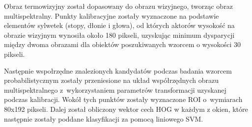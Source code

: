 Obraz termowizyjny został dopasowany do obrazu wizyjnego, tworząc obraz multispektralny. 
Punkty kalibracyjne zostały wyznaczone na podstawie elementów sylwetek (stopy, dłonie i głowa), od których aktorów wysokość na obrazie wizyjnym wynosiła około 180 pikseli, uzyskując minimum dysparycji między dwoma obrazami dla obiektów poszukiwanych wzorcem o wysokości 30 pikseli. %

Następnie wspołrzędne znalezionych kandydatów podczas badania wzorcem probabilistycznym zostały przeniesione na układ współrzędnych obrazu multispektralnego z~wykorzystaniem parametrów transformacji uzyskanej podczas kalibracji. 
Wokół tych punktów zostały wyznaczone ROI o~wymiarach 80x192 pikseli.
Dalej został obliczony wektor cech HOG w każdym z okien, które następnie zostały poddane klasyfikacji za pomocą liniowego SVM.

